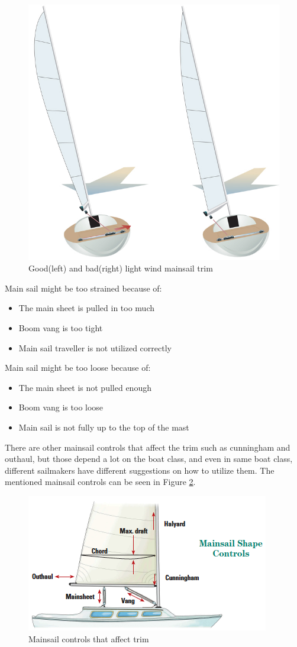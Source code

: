 \begin{figure}[h]
\centering
\includegraphics[width = 0.6\hsize]{figures/sail-trim-approach/mainsail-trim-back.jpg}
\caption{Good(left) and bad(right) light wind mainsail trim \cite{img:mainsail-trim-back}}
\label{fig:mainsail-trim}
\end{figure}

\noindent Main sail might be too strained because of:
\begin{itemize}
  \item The main sheet is pulled in too much
  \item Boom vang is too tight
  \item Main sail traveller is not utilized correctly
\end{itemize}

\noindent Main sail might be too loose because of:
\begin{itemize}
  \item The main sheet is not pulled enough
  \item Boom vang is too loose
  \item Main sail is not fully up to the top of the mast
\end{itemize}

There are other mainsail controls that affect the trim such as cunningham and outhaul, but those depend a lot on the boat class, and even in same boat class, different sailmakers have different suggestions on how to utilize them. The mentioned mainsail controls can be seen in Figure \ref{fig:mainsail-controls}.

\begin{figure}[h]
\centering
\includegraphics[width = 0.7\hsize]{figures/sail-trim-approach/mainsail-shape-controls.png}
\caption{Mainsail controls that affect trim \cite{img:mainsail-shape-controls}}
\label{fig:mainsail-controls}
\end{figure}


